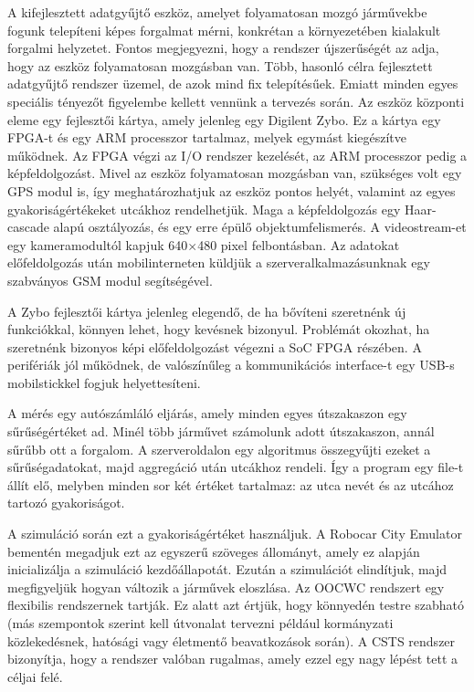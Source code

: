 \documentclass[a4paper,12pt]{report}
\begin{document}
A kifejlesztett adatgyűjtő eszköz, amelyet folyamatosan mozgó járművekbe fogunk telepíteni képes forgalmat mérni, konkrétan a környezetében kialakult forgalmi helyzetet. Fontos megjegyezni, hogy a rendszer újszerűségét az adja, hogy az eszköz folyamatosan mozgásban van. Több, hasonló célra fejlesztett adatgyűjtő rendszer üzemel, de azok mind fix telepítésűek. Emiatt minden egyes speciális tényezőt figyelembe kellett vennünk a tervezés során. Az eszköz központi eleme egy fejlesztői kártya, amely jelenleg egy Digilent Zybo. Ez a kártya egy FPGA-t és egy ARM processzor tartalmaz, melyek egymást kiegészítve működnek. Az FPGA végzi az I/O rendszer kezelését, az ARM processzor pedig a képfeldolgozást. Mivel az eszköz folyamatosan mozgásban van, szükséges volt egy GPS modul is, így meghatározhatjuk az eszköz pontos helyét, valamint az egyes gyakoriságértékeket utcákhoz rendelhetjük. Maga a képfeldolgozás egy Haar-cascade alapú osztályozás, és egy erre épülő objektumfelismerés. A videostream-et egy kameramodultól kapjuk 640$\times$480 pixel felbontásban. Az adatokat előfeldolgozás után mobilinterneten küldjük a szerveralkalmazásunknak egy szabványos GSM modul segítségével.

A Zybo fejlesztői kártya jelenleg elegendő, de ha bővíteni szeretnénk új funkciókkal, könnyen lehet, hogy kevésnek bizonyul. Problémát okozhat, ha szeretnénk bizonyos képi előfeldolgozást végezni a SoC FPGA részében. A perifériák jól működnek, de valószínűleg a kommunikációs interface-t egy USB-s mobilstickkel fogjuk helyettesíteni.

A mérés egy autószámláló eljárás, amely minden egyes útszakaszon egy sűrűségértéket ad. Minél több járművet számolunk adott útszakaszon, annál sűrűbb ott a forgalom. A szerveroldalon egy algoritmus összegyűjti ezeket a sűrűségadatokat, majd aggregáció után utcákhoz rendeli. Így a program egy file-t állít elő, melyben minden sor két értéket tartalmaz: az utca nevét és az utcához tartozó gyakoriságot.

A szimuláció során ezt a gyakoriságértéket használjuk. A Robocar City Emulator bementén megadjuk ezt az egyszerű szöveges állományt, amely ez alapján inicializálja a szimuláció kezdőállapotát. Ezután a szimulációt elindítjuk, majd megfigyeljük hogyan változik a járművek eloszlása. Az OOCWC rendszert egy flexibilis rendszernek tartják. Ez alatt azt értjük, hogy könnyedén testre szabható (más szempontok szerint kell útvonalat tervezni például kormányzati közlekedésnek, hatósági vagy életmentő beavatkozások során). A CSTS rendszer bizonyítja, hogy a rendszer valóban rugalmas, amely ezzel egy nagy lépést tett a céljai felé. 
\end{document}
